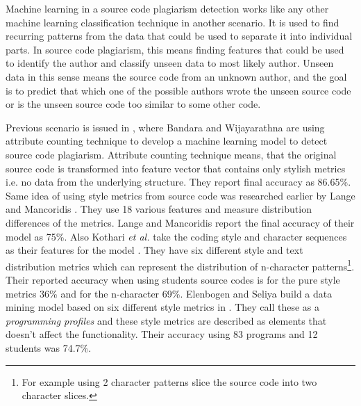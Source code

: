 \documentclass[english]{tktltiki2}
\theoremstyle{definition}
\theoremstyle{remark}
\begin{document}


Machine learning in a source code plagiarism detection works like any other machine learning classification technique in another scenario. It is used to find recurring patterns from the data that could be used to separate it into individual parts. In source code plagiarism, this means finding features that could be used to identify the author and classify unseen data to most likely author. Unseen data in this sense means the source code from an unknown author, and the goal is to predict that which one of the possible authors wrote the unseen source code or is the unseen source code too similar to some other code.


Previous scenario is issued in \cite{bandara2011machine}, where Bandara and Wijayarathna are using attribute counting technique to develop a machine learning model to detect source code plagiarism. Attribute counting technique means, that the original source code is transformed into feature vector that contains only stylish metrics i.e. no data from the underlying structure. They report final accuracy as 86.65\%. Same idea of using style metrics from source code was researched earlier by Lange and Mancoridis \cite{lange2007using}. They use 18 various features and measure distribution differences of the metrics. Lange and Mancoridis report the final accuracy of their model as 75\%. Also Kothari \textit{et al.} take the coding style and character sequences as their features for the model \cite{kothari2007probabilistic}. They have six different style  and text distribution metrics which can represent the distribution of n-character patterns\footnote{For example using 2 character patterns slice the source code into two character slices.}. Their reported accuracy when using students source codes is for the pure style metrics 36\% and for the n-character 69\%. Elenbogen and Seliya build a data mining model based on six different style metrics in \cite{Elenbogen:2008:DOS:1295109.1295123}. They call these as a \textit{programming profiles} and these style metrics are described as elements that doesn't affect the functionality. Their accuracy using 83 programs and 12 students was 74.7\%. 

\end{document}
